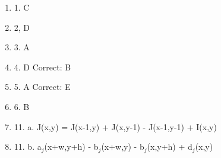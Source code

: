 \documentclass[11pt]{article}
\begin{document}
    \begin{enumerate}
        \item 1. C
        \item 2, D
        \item 3. A
        \item 4. D Correct: B
        \item 5. A Correct: E
        \item 6. B
        \item 11. a. J(x,y) = J(x-1,y) + J(x,y-1) - J(x-1,y-1) + I(x,y)
        \item 11. b. a$_j$(x+w,y+h) - b$_j$(x+w,y) - b$_j$(x,y+h) + d$_j$(x,y)
    \end{enumerate}
\end{document}
